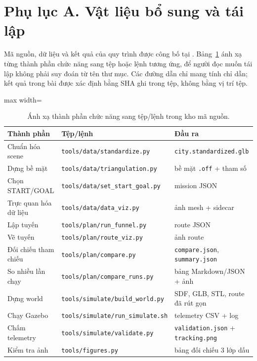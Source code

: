 
\section*{Phụ lục A. Vật liệu bổ sung và tái lập}\label{app:repro}

Mã nguồn, dữ liệu và kết quả của quy trình được công bố tại
\cite{kien2026repo}. Bảng~\ref{tab:appendix-files} ánh xạ từng thành phần chức
năng sang tệp hoặc lệnh tương ứng, để người đọc muốn tái lập không phải suy đoán
từ tên thư mục. Các đường dẫn chỉ mang tính chỉ dẫn; kết quả trong bài được xác
định bằng SHA ghi trong tệp, không bằng vị trí tệp.

\begin{table}[!t]
  \caption{Ánh xạ thành phần chức năng sang tệp/lệnh trong kho mã nguồn.}
  \label{tab:appendix-files}
  {\fontsize{7}{8.6}\selectfont
  \begin{adjustbox}{max width=\textwidth}
  \begin{tabular}{@{}lp{150pt}p{170pt}@{}}
    \toprule
    Thành phần & Tệp/lệnh & Đầu ra \\
    \midrule
    Chuẩn hóa scene & \texttt{tools/data/standardize.py} &
      \texttt{city.standardized.glb} \\
    Dựng bề mặt & \texttt{tools/data/triangulation.py} &
      bề mặt \texttt{.off} + tham số \\
    Chọn START/GOAL & \texttt{tools/data/set\_start\_goal.py} &
      mission JSON \\
    Trực quan hóa dữ liệu & \texttt{tools/data/data\_viz.py} &
      ảnh mesh + sidecar \\
    Lập tuyến & \texttt{tools/plan/run\_funnel.py} &
      route JSON \\
    Vẽ tuyến & \texttt{tools/plan/route\_viz.py} &
      ảnh route \\
    Đối chiếu tham chiếu & \texttt{tools/plan/compare.py} &
      \texttt{compare.json}, \texttt{summary.json} \\
    So nhiều lần chạy & \texttt{tools/plan/compare\_runs.py} &
      bảng Markdown/JSON + ảnh \\
    Dựng world & \texttt{tools/simulate/build\_world.py} &
      SDF, GLB, STL, route đã rút gọn \\
    Chạy Gazebo & \texttt{tools/simulate/run\_simulate.sh} &
      telemetry CSV + log \\
    Chấm telemetry & \texttt{tools/simulate/validate.py} &
      \texttt{validation.json} + \texttt{tracking.png} \\
    Kiểm tra ảnh & \texttt{tools/figures.py} &
      bảng đối chiếu 3 lớp dấu \\
    \bottomrule
  \end{tabular}
  \end{adjustbox}}
\end{table}

